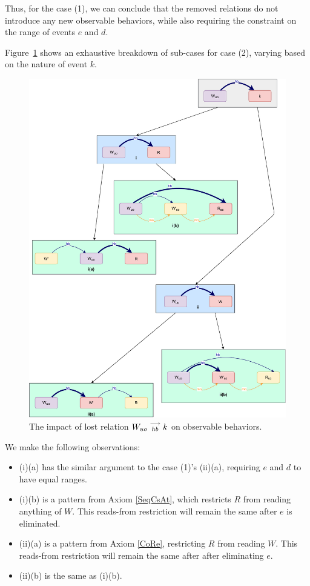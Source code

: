     Thus, for the case (1), we can conclude that the removed relations do not introduce any new observable behaviors, while also requiring the constraint on the range of events $e$ and $d$.

    Figure~\ref{elim_write:case2} shows an exhaustive breakdown of sub-cases for case (2), varying based
    on the nature of event $k$.
    \begin{figure}[H]
        \centering
        \includegraphics[scale=0.6]{5.Elimination/1.ValidEliminationCandidate/WriteElimProof/ProofParts/Part4Case2.pdf}
        \caption{The impact of lost relation $W_{uo}\stackrel{\longrightarrow}{_{hb}}k$ on observable behaviors.}
        \label{elim_write:case2}
    \end{figure}

    We make the following observations:
    \begin{itemize}
        \item (i)(a) has the similar argument to the case (1)'s (ii)(a), requiring $e$ and $d$ to have equal ranges.
        \item (i)(b) is a pattern from Axiom \ref{SeqCsAt}, which restricts $R$ from reading anything of $W$. This reads-from restriction will remain the same after $e$ is eliminated. 
        \item (ii)(a) is a pattern from Axiom \ref{CoRe}, restricting $R$ from reading $W$. This reads-from restriction will remain the same after after eliminating $e$.
        \item (ii)(b) is the same as (i)(b).
    \end{itemize}

